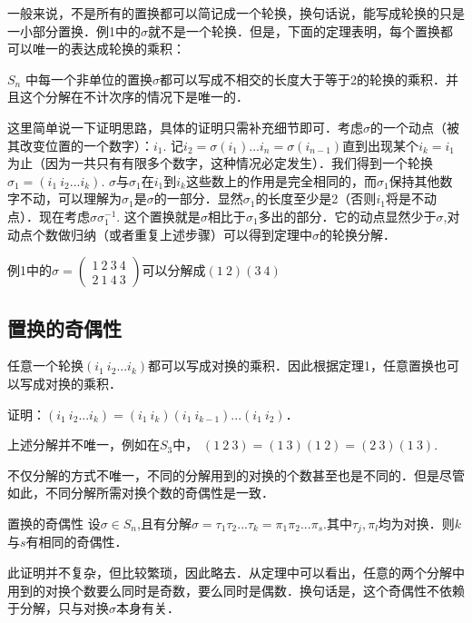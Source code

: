 一般来说，不是所有的置换都可以简记成一个轮换，换句话说，能写成轮换的只是一小部分置换．例1中的$\sigma$就不是一个轮换．但是，下面的定理表明，每个置换都可以唯一的表达成轮换的乘积：
\begin{theorem}{}
$S_n$ 中每一个非单位的置换$\sigma$都可以写成不相交的长度大于等于2的轮换的乘积．并且这个分解在不计次序的情况下是唯一的．
\end{theorem}
这里简单说一下证明思路，具体的证明只需补充细节即可．考虑$\sigma$的一个动点（被其改变位置的一个数字）：$i_1$. 记$i_2=\sigma(i_1)...i_n=\sigma(i_{n-1})$直到出现某个$i_k=i_1$为止（因为一共只有有限多个数字，这种情况必定发生）．我们得到一个轮换$\sigma_1=(i_1\ i_2...i_k)$. $\sigma$与$\sigma_1$在$i_1$到$i_k$这些数上的作用是完全相同的，而$\sigma_1$保持其他数字不动，可以理解为$\sigma_1$是$\sigma$的一部分．显然$\sigma_1$的长度至少是2（否则$i_1$将是不动点）．现在考虑$\sigma\sigma_1^{-1}$. 这个置换就是$\sigma$相比于$\sigma_1$多出的部分．它的动点显然少于$\sigma$,对动点个数做归纳（或者重复上述步骤）可以得到定理中$\sigma$的轮换分解．

\begin{example}{}
例1中的$\sigma=\begin{pmatrix}
1\ 2\ 3\ 4\\ 2\ 1\ 4\ 3
\end{pmatrix}$可以分解成$(1\ 2)(3\ 4)$
\end{example}

\subsection{置换的奇偶性}

\begin{lemma}{}
任意一个轮换$(i_1\ i_2...i_k)$都可以写成对换的乘积．因此根据定理1，任意置换也可以写成对换的乘积．
\end{lemma}
证明：$(i_1\ i_2...i_k)=(i_1\ i_k)(i_1\ i_{k-1})...(i_1\ i_2)$．

\begin{example}{}
上述分解并不唯一，例如在$S_3$中，
$(1\ 2\ 3)=(1\ 3)(1\ 2)=(2\ 3)(1\ 3)$.
\end{example}

不仅分解的方式不唯一，不同的分解用到的对换的个数甚至也是不同的．但是尽管如此，不同分解所需对换个数的奇偶性是一致．

\begin{theorem}{置换的奇偶性}
设$\sigma\in S_n$,且有分解$\sigma=\tau_1\tau_2...\tau_k=\pi_1\pi_2...\pi_s$.其中$\tau_j, \pi_l$均为对换．则$k$与$s$有相同的奇偶性．
\end{theorem}
此证明并不复杂，但比较繁琐，因此略去．从定理中可以看出，任意的两个分解中用到的对换个数要么同时是奇数，要么同时是偶数．换句话是，这个奇偶性不依赖于分解，只与对换$\sigma$本身有关．


